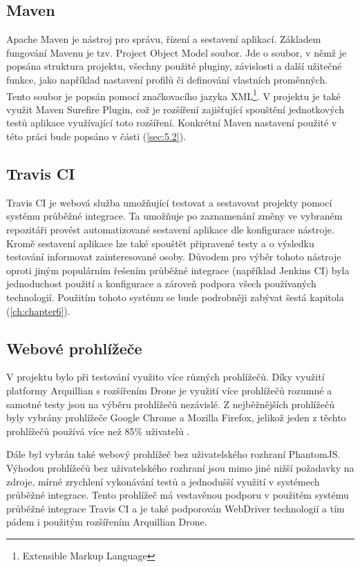 \documentclass[
    color,   %
	table,   %
    twoside, %
    nolot, nolof
]{fithesis3}
\begin{document}
\subsection{Maven}
\label{subsec:3.3.3}
Apache Maven \cite{Maven} je nástroj pro správu, řízení a sestavení aplikací. Základem fungování Mavenu je tzv. Project Object Model soubor. Jde o soubor, v němž je popsána struktura projektu, všechny použité pluginy, závislosti a další užitečné funkce, jako například nastavení profilů či definování vlastních proměnných. Tento soubor je popsán pomocí značkovacího jazyka XML\footnote{Extensible Markup Language}. V projektu je také využit Maven Surefire Plugin, což je rozšíření zajišťující spouštění jednotkových testů aplikace využívající toto rozšíření. Konkrétní Maven nastavení použité v této práci bude popsáno v části (\ref{sec:5.2}).
\subsection{Travis CI}
Travis CI je webová služba umožňující testovat a sestavovat projekty pomocí systému průběžné integrace. Ta umožňuje po zaznamenání změny ve vybraném repozitáři provést automatizované sestavení aplikace dle konfigurace nástroje. Kromě sestavení aplikace lze také spouštět připravené testy a o výsledku testování informovat zainteresované osoby. Důvodem pro výběr tohoto nástroje oproti jiným populárním řešením průběžné integrace (například Jenkins CI) byla jednoduchost použití a konfigurace a zároveň podpora všech používaných technologií. Použitím tohoto systému se bude podrobněji zabývat šestá kapitola (\ref{ch:chapter6}).
\subsection{Webové prohlížeče}
V projektu bylo při testování využito více různých prohlížečů. Díky využití platformy Arquillian s rozšířením Drone je využití více prohlížečů rozumné a samotné testy jsou na výběru prohlížečů nezávislé. Z nejběžnějších prohlížečů byly vybrány prohlížeče Google Chrome a Mozilla Firefox, jelikož jeden z těchto prohlížečů používá více než 85\% uživatelů \cite{Browsers}.

Dále byl vybrán také webový prohlížeč bez uživatelského rozhraní PhantomJS. Výhodou prohlížečů bez uživatelského rozhraní jsou mimo jiné nižší požadavky na zdroje, mírné zrychlení vykonávání testů a jednodušší využití v systémech průběžné integrace. Tento prohlížeč má vestavěnou podporu v použitém systému průběžné integrace Travis CI a je také podporován WebDriver technologií a tím pádem i použitým rozšířením Arquillian Drone.
\end{document}
